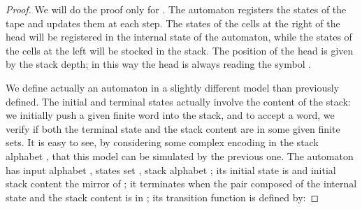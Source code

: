 \documentclass{llncs}
\begin{document}
\begin{proof}
We will do the proof only for .
The automaton registers the states of the tape and updates them at each step.
The states of the cells at the right of the head will be registered in the internal state of the automaton, while the states of the cells at the left will be stocked in the stack.
The position of the head is given by the stack depth; in this way the head is always reading the symbol .

We define actually an automaton in a slightly different model than previously defined. The initial and terminal states actually involve the content of the stack: we initially push a given finite word into the stack, and to accept a word, we verify if both the terminal state and the stack content are in some given finite sets. It is easy to see, by considering some complex encoding in the stack alphabet , that this model can be simulated by the previous one.
The automaton  has input alphabet , states set , stack alphabet ; its initial state is  and initial stack content the mirror of ; it terminates when the pair composed of the internal state and the stack content is in ; its transition function  is defined by:





\end{proof}
\end{document}
